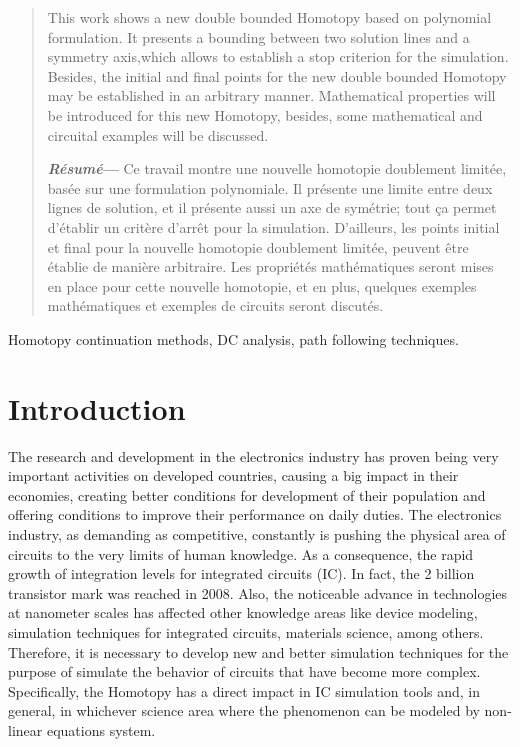 \documentclass[journal,twocolumn]{IEEEtran}
\begin{document}
\begin{abstract}

This work shows a new double bounded Homotopy based on polynomial formulation. It presents a bounding between two solution lines and a symmetry axis,which allows to establish a stop criterion for the simulation. Besides, the initial and final points for the new double bounded Homotopy may be established in an arbitrary manner. Mathematical properties will be introduced for this new Homotopy, besides, some mathematical and circuital examples will be discussed.


\vspace{6mm}

{\bfseries\textit{R\'esum\'e}--- } Ce travail montre une nouvelle homotopie doublement limit\'ee, bas\'ee sur une formulation polynomiale. Il pr\'esente une limite entre deux lignes de solution, et il pr\'esente aussi un axe de sym\'etrie; tout ça permet d'\'etablir un crit\`ere d'arr\^et pour la simulation. D'ailleurs, les points initial et final pour la nouvelle homotopie doublement limit\'ee, peuvent \^etre \'etablie de mani\`ere arbitraire. Les propri\'et\'es math\'ematiques seront mises en place pour cette nouvelle homotopie, et en plus, quelques exemples math\'ematiques et exemples de circuits seront discut\'es.
\end{abstract}

\begin{keywords}
Homotopy continuation methods, DC analysis, path following techniques.
\end{keywords}

\section{Introduction}

The research and development in the electronics industry has proven being very important activities on developed countries, causing a big impact in their economies, creating better conditions for development of their population and offering conditions to improve their performance on daily duties. The electronics industry, as demanding as competitive, constantly is pushing the physical area of circuits to the very limits of human knowledge. As a consequence, the rapid growth of integration levels for integrated circuits (IC). In fact, the 2 billion transistor mark was reached in 2008. Also, the noticeable advance in technologies at nanometer scales has affected other knowledge areas like device modeling, simulation techniques for integrated circuits, materials science, among others. Therefore, it is necessary to develop new and better simulation techniques for the purpose of simulate the behavior of circuits that have become more complex. Specifically, the Homotopy has a direct impact in IC simulation tools and, in general, in whichever science area where the phenomenon can be modeled by non-linear equations system.
\end{document}
